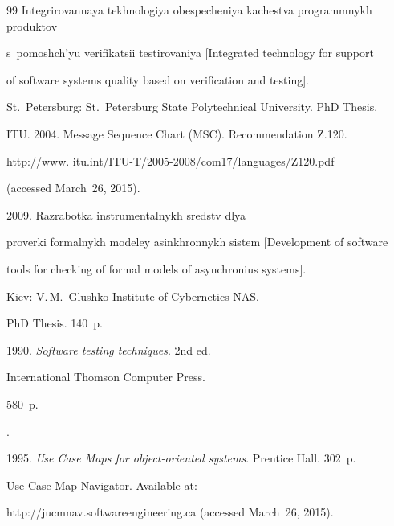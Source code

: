 {{\begin{thebibliography}{99}
Integrirovannaya tekhnologiya obespecheniya kachestva programmnykh produktov


s~pomoshch'yu verifikatsii testirovaniya [Integrated technology for support


of software systems quality based on verification and testing].


 St.\ Petersburg: St.\ Petersburg State Polytechnical University. PhD Thesis.




ITU. 2004.  Message Sequence Chart (MSC). Recommendation Z.120.


{\sf


http://www. itu.int/ITU-T/2005-2008/com17/languages/Z120.pdf}


(accessed March~26, 2015).




 2009. Razrabotka instrumentalnykh sredstv dlya


proverki formalnykh modeley asinkhronnykh sistem [Development of software


tools for checking of formal models of asynchronius systems].


Kiev: V.\,M.~Glushko Institute of Cybernetics NAS.


PhD Thesis. 140~p.




 1990.  \textit{Software testing techniques}. 2nd ed.


International Thomson Computer Press. %


580~p.




.


 1995. \textit{Use Case Maps for object-oriented systems}. Prentice Hall. 302~p.




Use Case Map Navigator.  Available at:


{\sf http://jucmnav.softwareengineering.ca} (accessed March~26, 2015).


\end{thebibliography}


} }








\vspace*{-6pt}





